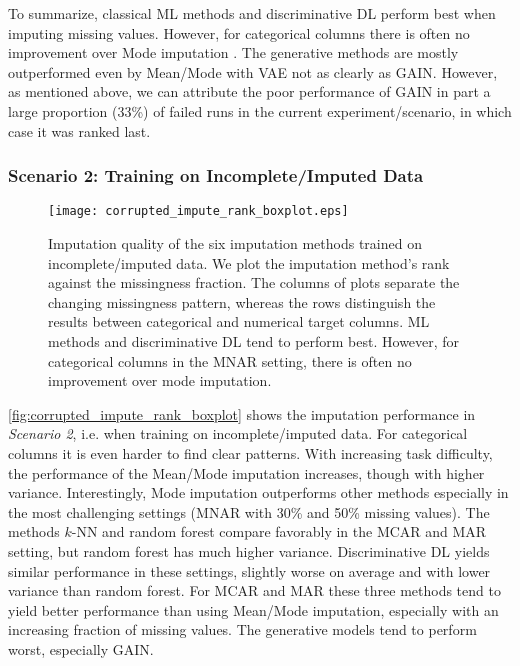 To summarize, classical ML methods and discriminative DL perform best when imputing missing values. However, for categorical columns there is often no improvement over Mode imputation . The generative methods are mostly outperformed even by Mean/Mode with VAE not as clearly as GAIN. However, as mentioned above, we can attribute the poor performance of GAIN in part a large proportion (33\%) of failed runs in the current experiment/scenario, in which case it was ranked last.


\subsubsection{Scenario 2: Training on Incomplete/Imputed Data}


\begin{figure}\centering
    \texttt{[image: corrupted\_impute\_rank\_boxplot.eps]}

    \caption[Imputation Ranks - Corrupted]{Imputation quality of the six imputation methods trained on incomplete/imputed data. We plot the imputation method's rank against the missingness fraction. The columns of plots separate the changing missingness pattern, whereas the rows distinguish the results between categorical and numerical target columns. ML methods and discriminative DL tend to perform best. However, for categorical columns in the MNAR setting, there is often no improvement over mode imputation. 
    }
	\label{fig:corrupted_impute_rank_boxplot}
\end{figure}

\autoref{fig:corrupted_impute_rank_boxplot} shows the imputation performance in \textit{Scenario 2}, i.e. when training on incomplete/imputed data. For categorical columns it is even harder to find clear patterns. With increasing task difficulty, the performance of the Mean/Mode imputation increases, though with higher variance. Interestingly, Mode imputation outperforms other methods especially in the most challenging settings (MNAR with 30\% and 50\% missing values). The methods $k$-NN and random forest compare favorably in the MCAR and MAR setting, but random forest has much higher variance. Discriminative DL yields similar performance in these settings, slightly worse on average and with lower variance than random forest. For MCAR and MAR these three methods tend to yield better performance than using Mean/Mode imputation, especially with an increasing fraction of missing values. The generative models tend to perform worst, especially GAIN.

